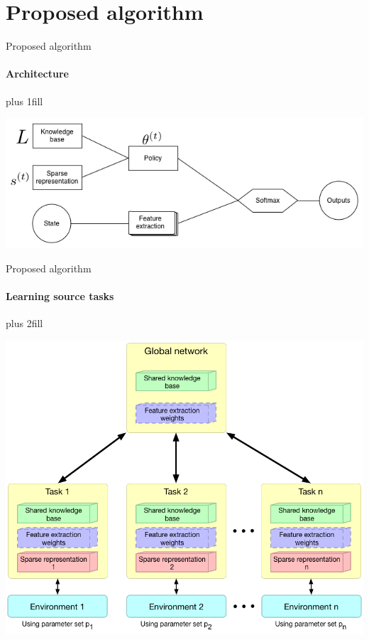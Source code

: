 \section{Proposed algorithm}
\begin{frame}[fragile]{Proposed algorithm}
\framesubtitle{Architecture}
\vskip0pt plus 1fill
\begin{center}
    \includegraphics[width=\linewidth]{knowledge_transfer.png}
\end{center}
\end{frame}

\begin{frame}[fragile]{Proposed algorithm}
\framesubtitle{Learning source tasks}
\vskip1.5cm plus 2fill
\begin{center}
    \includegraphics[width=.75\linewidth]{knowledge_transfer_tasks.png}
\end{center}
\end{frame}


